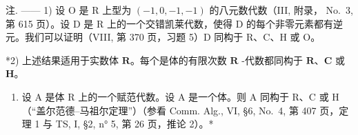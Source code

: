 注. —— 1) 设 O 是 R 上型为 \((-1,0,-1,-1)\) 的八元数代数（III, 附录， No.~3, 第 615 页）。设 D 是 R 上的一个交错凯莱代数，使得 D 的每个非零元素都有逆元。我们可以证明（VIII, 第 370 页，习题 5）D 同构于 R、C、H 或 O。

*2) 上述结果适用于实数体 \(\mathbf{R}\)。每个是体的有限次数 \(\mathbf{R}\) -代数都同构于 \(\mathbf{R}\)、\(\mathbf{C}\) 或 \(\mathbf{H}\)。

\begin{enumerate}
\def\labelenumi{\arabic{enumi})}
\setcounter{enumi}{2}
\tightlist
\item
  设 A 是体 R 上的一个赋范代数。设 A 是一个体。则 A 同构于 R、C 或 H（``盖尔范德--马祖尔定理''）（参看 Comm. Alg., VI, §6, No.~4, 第 407 页，定理 1 与 TS, I, §2, n° 5, 第 26 页，推论 2）。*
\end{enumerate}

